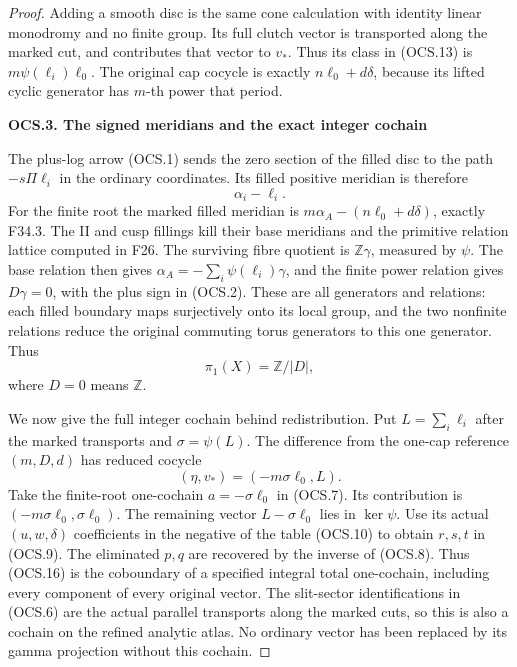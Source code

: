 \begin{proof}
Adding a smooth disc is the same cone calculation with identity
linear monodromy and no finite group. Its full clutch vector is
transported along the marked cut, and contributes that vector to
\(v_*\). Thus its class in (OCS.13) is
\(m\psi(\ell_i)\ell_0\). The original cap cocycle is exactly
\(n\ell_0+d\delta\), because its lifted cyclic generator has
\(m\)-th power that period.

\par

\medskip\noindent\textbf{OCS.3. The signed meridians and the exact integer cochain}

\par\nobreak

The plus-log arrow (OCS.1) sends the zero section of the filled
disc to the path \(-s\Pi\ell_i\) in the ordinary coordinates.
Its filled positive meridian is therefore
\[
                         \alpha_i-\ell_i.
\tag{OCS.14}
\]
For the finite root the marked filled meridian is
\(m\alpha_A-(n\ell_0+d\delta)\), exactly F34.3. The II and cusp
fillings kill their base meridians and the primitive relation
lattice computed in F26. The surviving fibre quotient is
\(\mathbb Z\gamma\), measured by \(\psi\). The base relation
then gives \(\alpha_A=-\sum_i\psi(\ell_i)\gamma\), and the
finite power relation gives \(D\gamma=0\), with the plus sign
in (OCS.2). These are all generators and relations: each filled
boundary maps surjectively onto its local group, and the two
nonfinite relations reduce the original commuting torus generators
to this one generator. Thus
\[
                         \pi_1(X)=\mathbb Z/|D|,
\tag{OCS.15}
\]
where \(D=0\) means \(\mathbb Z\).

We now give the full integer cochain behind redistribution. Put
\(L=\sum_i\ell_i\) after the marked transports and
\(\sigma=\psi(L)\). The difference from the one-cap reference
\((m,D,d)\) has reduced cocycle
\[
                  (\eta,v_*)=(-m\sigma\ell_0,L).
\tag{OCS.16}
\]
Take the finite-root one-cochain \(a=-\sigma\ell_0\) in (OCS.7).
Its contribution is \((-m\sigma\ell_0,\sigma\ell_0)\).
The remaining vector \(L-\sigma\ell_0\) lies in \(\ker\psi\).
Use its actual \((u,w,\delta)\) coefficients in the negative
of the table (OCS.10) to obtain \(r,s,t\) in (OCS.9).
The eliminated \(p,q\) are recovered by the inverse of (OCS.8).
Thus (OCS.16) is the coboundary of a specified integral total
one-cochain, including every component of every original vector.
The slit-sector identifications in (OCS.6) are the actual parallel
transports along the marked cuts, so this is also a cochain on
the refined analytic atlas. No ordinary vector has been replaced
by its gamma projection without this cochain.


\end{proof}

